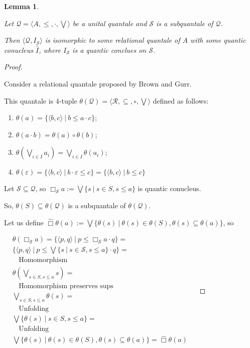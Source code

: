 \documentclass[a4paper]{article}
\theoremstyle{defin}
\theoremstyle{theorem}
\theoremstyle{prop}
\theoremstyle{lemma}
\newtheorem{lemma}{Lemma}
\theoremstyle{ex}
\theoremstyle{col}
\begin{document}
\begin{lemma}
  $ $

  Let $\mathcal{Q} = \langle A, \leq, \cdot, \bigvee \rangle$ be a unital quantale and $\mathcal{S}$ is a subquantale of $\mathcal{Q}$.

  Then $\langle \mathcal{Q}, I_{\mathcal{S}} \rangle$ is isomorphic to some relational quantale of $A$
  with some quantic conucleus $\hat{I}$, where $I_{\mathcal{S}}$ is a quantic conclues on $\mathcal{S}$.
\end{lemma}

\begin{proof}
$ $

  Consider a relational quantale proposed by Brown and Gurr.

  This quantale is 4-tuple $\theta(\mathcal{Q}) = \langle \mathcal{R}, \subseteq, \circ, \bigvee \rangle$ defined as follows:
  \begin{enumerate}
    \item $\theta(a) = \{ \langle b, c \rangle \: | \: b \leq a \cdot c \}$;
    \item $\theta(a \cdot b) = \theta(a) \circ \theta(b)$;
    \item $\theta(\bigvee \limits_{i \in I} a_i) = \bigvee \limits_{i \in I} \theta(a_i)$;
    \item $\theta(\varepsilon) = \{ \langle b, c \rangle \: | \: b \cdot \varepsilon \leq c \} = \{ \langle b, c \rangle \: | \: b \leq c \}$
  \end{enumerate}

  Let $\mathcal{S} \subseteq \mathcal{Q}$, so $\Box_{\mathcal{S}} a := \bigvee \{ s \: | \: s \in S, s \leq a \}$ is quantic conucleus.

  So, $\theta(S) \subseteq \theta(\mathcal{Q})$ is a subquantale of $\theta(\mathcal{Q})$.

  Let us define $\hat{\Box} \theta(a) := \bigvee \{ \theta(s) \: | \: \theta(s) \in \theta(S), \theta(s) \subseteq \theta(a) \}$, so

  $\begin{array}{lll}
  &\theta(\Box_{\mathcal{S}} a) = \{ \langle p, q \rangle \: | \: p \leq \Box_{\mathcal{S}} a \cdot q \} = &\\
  &\{ \langle p, q \rangle \: | \: p \leq \bigvee \{ s \: | \: s \in \mathcal{S}, s \leq a \} \cdot q \} = &\\
  &\:\:\:\: \text{Homomorphism}& \\
  &\theta(\bigvee_{s \in S, s \leq a} s) = & \\
  &\:\:\:\: \text{Homomorphism preserves sups}& \\
  &\bigvee_{s \in S, s \leq a} \theta(s) = & \\
  &\:\:\:\: \text{Unfolding}& \\
  &\bigvee \{ \theta(s) \: | \: s \in S, s \leq a \} = & \\
  &\:\:\:\: \text{Unfolding}& \\
  &\bigvee \{ \theta(s) \: | \: \theta(s) \in \theta(S), \theta(s) \subseteq \theta(a) \} = \hat{\Box} \theta(a)& \\
  \end{array}$


\end{proof}
\end{document}
